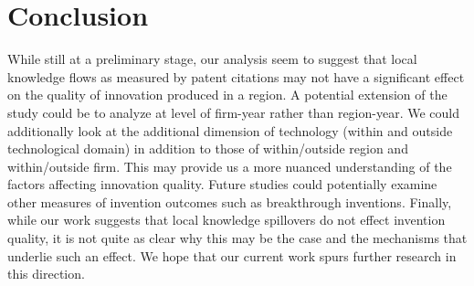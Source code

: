 \documentclass[10pt,letterpaper]{article}
\begin{document}
\section*{Conclusion}
While still at a preliminary stage, our analysis seem to suggest that local knowledge flows as measured by patent citations may not have a significant effect on the quality of innovation produced in a region. A potential extension of the study could be to analyze at level of firm-year rather than region-year. We could additionally look at the additional dimension of technology (within and outside technological domain) in addition to those of within/outside region and within/outside firm. This may provide us a more nuanced understanding of the factors affecting innovation quality. Future studies could potentially examine other measures of invention outcomes such as breakthrough inventions. Finally, while our work suggests that local knowledge spillovers do not effect invention quality, it is not quite as clear why this may be the case and the mechanisms that underlie such an effect. We hope that our current work spurs further research in this direction.  


 

\newpage


\end{document}
